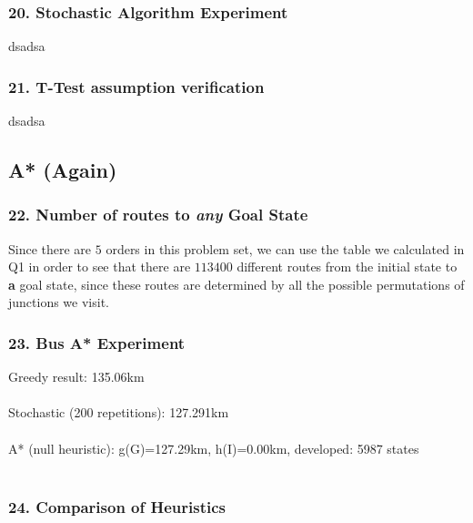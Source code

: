 \documentclass{article}
\begin{document}
\subsubsection*{20. Stochastic Algorithm Experiment}
dsadsa

\subsubsection*{21. T-Test assumption verification}
dsadsa

\subsection*{A* (Again)}
\subsubsection*{22. Number of routes to \emph{any} Goal State}
Since there are $5$ orders in this problem set, we can use the table we calculated in Q1 in order to see that there are $113400$ different routes from the initial state to \textbf{a} goal state, since these routes are determined by all the possible permutations of junctions we visit.

\subsubsection*{23. Bus A* Experiment}
Greedy result: 135.06km \\~\\
Stochastic (200 repetitions): 127.291km \\~\\
A* (null heuristic):    g(G)=127.29km, h(I)=0.00km, developed: 5987 states \\~\\

\subsubsection*{24. Comparison of Heuristics}
\end{document}
